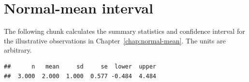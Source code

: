 \section{Normal-mean interval}
The following chunk calculates the summary statistics and confidence interval
for the illustrative observations in Chapter~\ref{chap:normal-mean}.
The units are arbitrary.

\begin{knitrout}
\color{fgcolor}\begin{kframe}
\begin{alltt}
 \hlkwb{<-} \hldef{(}\hldef{,} \hldef{,} \hldef{)}
 \hlkwb{<-} 
 \hlkwb{<-} 
 \hlkwb{<-} 
 \hlkwb{<-}  \hlopt{/} 
 \hlkwb{<-}  \hlopt{+} \hldef{(}\hlopt{-}\hldef{,} \hldef{)} \hlopt{*} \hldef{(}\hldef{,}   \hlopt{-} \hldef{)} \hlopt{*} 
\hldef{(}\hldef{(}       
         \hldef{= ci[}\hldef{],}  \hldef{= ci[}\hldef{]),} \hldef{)}
\end{alltt}
\begin{verbatim}
##      n   mean     sd     se  lower  upper 
##  3.000  2.000  1.000  0.577 -0.484  4.484
\end{verbatim}
\end{kframe}
\end{knitrout}
